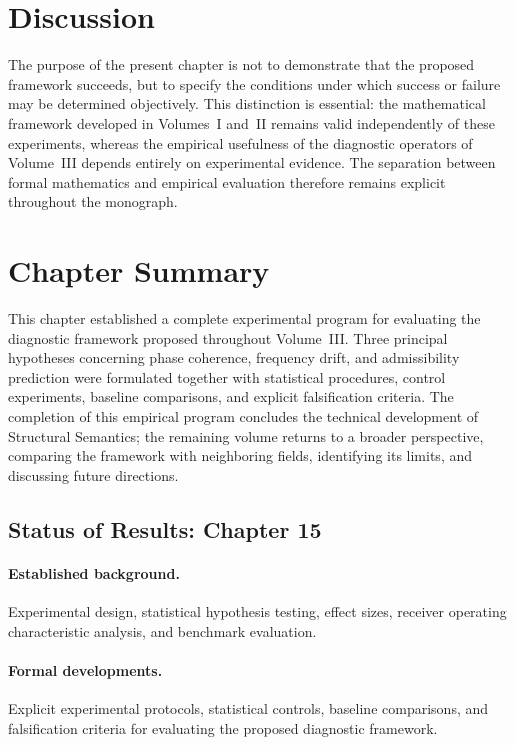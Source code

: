 \documentclass[11pt,twoside,openright]{book}
\numberwithin{equation}{chapter}
\theoremstyle{definition}
\theoremstyle{plain}
\theoremstyle{remark}
\theoremstyle{definition}
\begin{document}
\section{Discussion}

The purpose of the present chapter is not to demonstrate that the
proposed framework succeeds, but to specify the conditions under which
success or failure may be determined objectively. This distinction is
essential: the mathematical framework developed in Volumes~I and~II
remains valid independently of these experiments, whereas the empirical
usefulness of the diagnostic operators of Volume~III depends entirely on
experimental evidence. The separation between formal mathematics and
empirical evaluation therefore remains explicit throughout the monograph.

\section{Chapter Summary}

This chapter established a complete experimental program for evaluating
the diagnostic framework proposed throughout Volume~III. Three principal
hypotheses concerning phase coherence, frequency drift, and admissibility
prediction were formulated together with statistical procedures, control
experiments, baseline comparisons, and explicit falsification criteria.
The completion of this empirical program concludes the technical
development of Structural Semantics; the remaining volume returns to a
broader perspective, comparing the framework with neighboring fields,
identifying its limits, and discussing future directions.

\subsection*{Status of Results: Chapter 15}

\paragraph{Established background.} Experimental design, statistical
hypothesis testing, effect sizes, receiver operating characteristic
analysis, and benchmark evaluation.

\paragraph{Formal developments.} Explicit experimental protocols,
statistical controls, baseline comparisons, and falsification criteria
for evaluating the proposed diagnostic framework.
\end{document}
